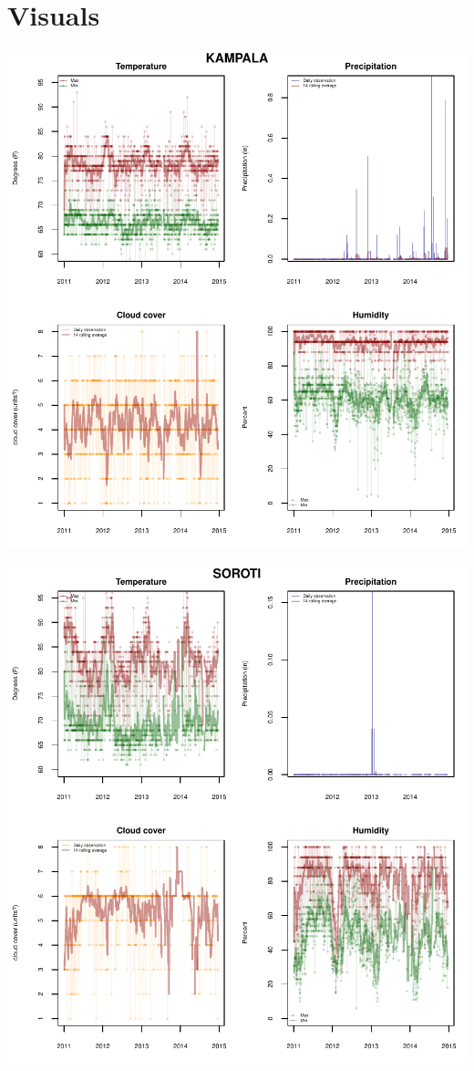 \documentclass[11pt]{article}
\begin{document}
\section*{Visuals}
\hrulefill

\begin{center}
\includegraphics{uganda_weather_first_pass-002}


\includegraphics{uganda_weather_first_pass-003}
\end{center}
\end{document}

